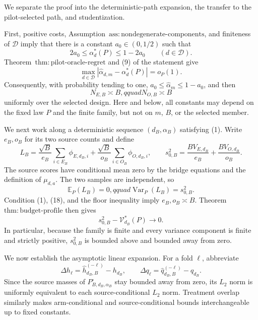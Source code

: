 We separate the proof into the deterministic-path expansion, the transfer to the pilot-selected path, and studentization.

First, positive costs, Assumption~\(\mathrm{ass{:}nondegenerate\text{-}components}\), and finiteness of \(\mathcal D\) imply that there is a constant \(a_0\in(0,1/2)\) such that
\[
 2a_0\le \alpha_d^*(P)\le1-2a_0
 \qquad(d\in\mathcal D).                                         \tag{18}
\]
Theorem~\(\mathrm{thm{:}pilot\text{-}oracle\text{-}regret}\) and (9) of the statement give
\[
 \max_{d\in\mathcal D}
 |\widehat\alpha_{d,m}-\alpha_d^*(P)|=o_P(1).                     \tag{19}
\]
Consequently, with probability tending to one, \(a_0\le\widehat\alpha_m\le1-a_0\), and then
\[
 N_{E,B}\asymp B,qquad N_{O,B}\asymp B                         \tag{20}
\]
uniformly over the selected design.  Here and below, all constants may depend on the fixed law \(P\) and the finite family, but not on \(m\), \(B\), or the selected member.

We next work along a deterministic sequence \((d_B,\alpha_B)\) satisfying (1).  Write \(e_B,o_B\) for its two source counts and define
\[
 L_B=\frac{\sqrt B}{e_B}\sum_{i\in E_B}\phi_{E,d_B,i}
     +\frac{\sqrt B}{o_B}\sum_{i\in O_B}\phi_{O,d_B,i},
 \qquad
 s_{0,B}^2=\frac{B V_{E,d_B}}{e_B}+\frac{B V_{O,d_B}}{o_B}.        \tag{21}
\]
The source scores have conditional mean zero by the bridge equations and the definition of \(\mu_{d,a}\).  The two samples are independent, so
\[
 \mathbb E_P(L_B)=0,qquad \operatorname{Var}_P(L_B)=s_{0,B}^2.  \tag{22}
\]
Condition (1), (18), and the floor inequality imply \(e_B,o_B\asymp B\).  Theorem~\(\mathrm{thm{:}budget\text{-}profile}\) then gives
\[
 s_{0,B}^2-\mathcal V_{d_B}^*(P)\longrightarrow0.                 \tag{23}
\]
In particular, because the family is finite and every variance component is finite and strictly positive, \(s_{0,B}^2\) is bounded above and bounded away from zero.

We now establish the asymptotic linear expansion.  For a fold \(\ell\), abbreviate
\[
 \Delta h_\ell=\widehat h_{d_B,B}^{(-\ell)}-h_{d_B},
 \qquad
 \Delta q_\ell=\widehat q_{d_B,B}^{(-\ell)}-q_{d_B}.
\]
Since the source masses of \(P_{B,d_B,\alpha_B}^{\circ}\) stay bounded away from zero, its \(L_2\) norm is uniformly equivalent to each source-conditional \(L_2\) norm.  Treatment overlap similarly makes arm-conditional and source-conditional bounds interchangeable up to fixed constants.


